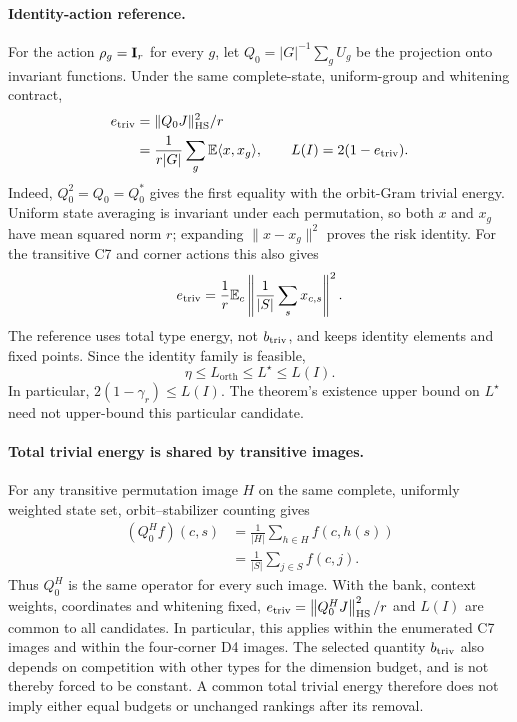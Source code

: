 \paragraph{Identity-action reference.}
\label{sp:identity-reference}
For the action $\rho_g=\mathbf{I}_r$ for every $g$, let $Q_0=|G|^{-1}\sum_gU_g$ be the projection onto invariant functions. Under the same complete-state, uniform-group and whitening contract,
\[
 \begin{aligned}
 e_{\rm triv}
 &=
 \|Q_0J\|_{\rm HS}^2/r
 \\
 &=
 \frac1{r|G|}
 \sum_g\mathbb E\langle x,x_g\rangle,
 \qquad
 L(I)=2(1-e_{\rm triv}).
 \end{aligned}
\]
Indeed, $Q_0^2=Q_0=Q_0^*$ gives the first equality with the orbit-Gram trivial energy. Uniform state averaging is invariant under each permutation, so both $x$ and $x_g$ have mean squared norm $r$; expanding $\|x-x_g\|^2$ proves the risk identity. For the transitive C7 and corner actions this also gives
\[
 e_{\rm triv}=\frac1r\mathbb E_c\left\|\frac1{|S|}\sum_s x_{c,s}\right\|^2.
\]
The reference uses total type energy, not $b_{\rm triv}$, and keeps identity elements and fixed points. Since the identity family is feasible,
\[
 \eta\le L_{\mathrm{orth}}\le L^\star\le L(I).
\]
In particular, $2(1-\gamma_r)\le L(I)$. The theorem's existence upper bound on $L^\star$ need not upper-bound this particular candidate.

\paragraph{Total trivial energy is shared by transitive images.}
For any transitive permutation image $H$ on the same complete, uniformly weighted state set, orbit--stabilizer counting gives
\begin{equation}
 \begin{aligned}
 (Q_0^Hf)(c,s)
 &=
 \frac1{|H|}
 \sum_{h\in H}f(c,h(s))
 \\
 &=
 \frac1{|S|}
 \sum_{j\in S}f(c,j).
 \end{aligned}
 \label{sp:transitive-trivial-energy}
\end{equation}
Thus $Q_0^H$ is the same operator for every such image. With the bank, context weights, coordinates and whitening fixed, $e_{\rm triv}=\left\lVert Q_0^HJ\right\rVert_{\mathrm{HS}}^2/r$ and $L(I)$ are common to all candidates. In particular, this applies within the enumerated C7 images and within the four-corner D4 images. The selected quantity $b_{\rm triv}$ also depends on competition with other types for the dimension budget, and is not thereby forced to be constant. A common total trivial energy therefore does not imply either equal budgets or unchanged rankings after its removal.

